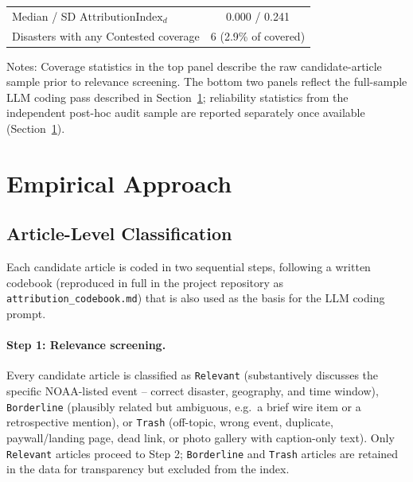 \documentclass[12pt]{article}
\begin{document}
\begin{table}[ht]
\begin{threeparttable}
\begin{tabular}{lc}
Median / SD $\text{AttributionIndex}_d$ & 0.000 / 0.241 \\
Disasters with any Contested coverage & 6 (2.9\% of covered) \\
\bottomrule
\end{tabular}
\begin{tablenotes}
\small
\item Notes: Coverage statistics in the top panel describe the raw
candidate-article sample prior to relevance screening. The bottom two
panels reflect the full-sample LLM coding pass described in
Section~\ref{sec:methods}; reliability statistics from the
independent post-hoc audit sample are reported separately once
available (Section~\ref{sec:methods}).
\end{tablenotes}
\end{threeparttable}
\end{table}


\section{Empirical Approach}
\label{sec:methods}

\subsection{Article-Level Classification}

Each candidate article is coded in two sequential steps, following a
written codebook (reproduced in full in the project repository as
\texttt{attribution\_codebook.md}) that is also used as the basis for
the LLM coding prompt.

\paragraph{Step 1: Relevance screening.} Every candidate article is
classified as \texttt{Relevant} (substantively discusses the specific
NOAA-listed event -- correct disaster, geography, and time window),
\texttt{Borderline} (plausibly related but ambiguous, e.g.\ a brief
wire item or a retrospective mention), or \texttt{Trash} (off-topic,
wrong event, duplicate, paywall/landing page, dead link, or
photo gallery with caption-only text). Only
\texttt{Relevant} articles proceed to Step 2; \texttt{Borderline} and
\texttt{Trash} articles are retained in the data for transparency but
excluded from the index.
\end{document}
